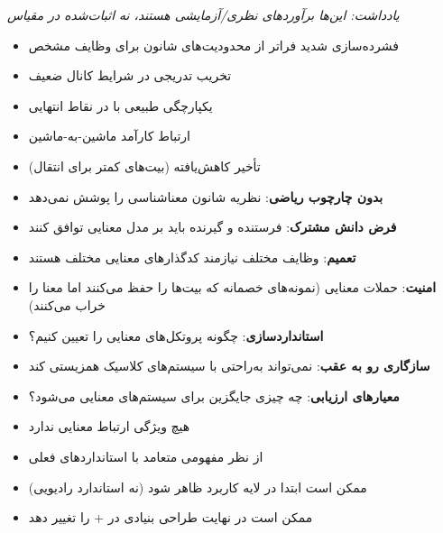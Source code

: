\emph{یادداشت: این‌ها برآوردهای نظری/\allowbreak{}آزمایشی هستند، نه اثبات‌شده در مقیاس}


\begin{itemize}
\tightlist
\item
  فشرده‌سازی شدید فراتر از محدودیت‌های شانون برای وظایف مشخص
\item
  تخریب تدریجی در شرایط کانال ضعیف
\item
  یکپارچگی طبیعی با  در نقاط انتهایی
\item
  ارتباط کارآمد ماشین-به-ماشین
\item
  تأخیر کاهش‌یافته (بیت‌های کمتر برای انتقال)
\end{itemize}


\begin{itemize}
\tightlist
\item
  \textbf{بدون چارچوب ریاضی}: نظریه شانون معناشناسی را پوشش نمی‌دهد
\item
  \textbf{فرض دانش مشترک}: فرستنده و گیرنده باید بر مدل معنایی توافق کنند
\item
  \textbf{تعمیم}: وظایف مختلف نیازمند کدگذارهای معنایی مختلف هستند
\item
  \textbf{امنیت}: حملات معنایی (نمونه‌های خصمانه که بیت‌ها را حفظ می‌کنند اما معنا را خراب می‌کنند)
\item
  \textbf{استانداردسازی}: چگونه پروتکل‌های معنایی را تعیین کنیم؟
\item
  \textbf{سازگاری رو به عقب}: نمی‌تواند به‌راحتی با سیستم‌های کلاسیک همزیستی کند
\item
  \textbf{معیارهای ارزیابی}: چه چیزی جایگزین  برای سیستم‌های معنایی می‌شود؟
\end{itemize}


\begin{itemize}
\tightlist
\item
   هیچ ویژگی ارتباط معنایی ندارد
\item
  از نظر مفهومی متعامد با استانداردهای فعلی
\item
  ممکن است ابتدا در لایه کاربرد ظاهر شود (نه استاندارد رادیویی)
\item
  ممکن است در نهایت طراحی بنیادی  در + را تغییر دهد
\end{itemize}


